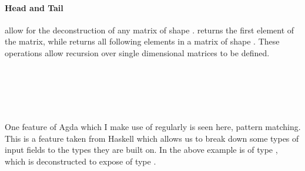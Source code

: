 \paragraph{Head and Tail} allow for the deconstruction of any matrix of shape 
. 
 returns the first element of the matrix, while
 returns all following elements in a matrix of shape .
These operations allow recursion over single dimensional matrices to be defined.

\begin{code}%
%
\>[2]\AgdaSpace{}%
\AgdaSymbol{:}\AgdaSpace{}%
\AgdaSpace{}%
\AgdaSymbol{(}\AgdaSpace{}%
\AgdaSymbol{(}\AgdaSpace{}%
\AgdaSymbol{))}\AgdaSpace{}%
\AgdaSpace{}%
\AgdaSpace{}%
\<%
\\
%
\>[2]\AgdaSpace{}%
\AgdaSpace{}%
\AgdaSymbol{=}\AgdaSpace{}%
\AgdaSpace{}%
\AgdaSymbol{(}\AgdaSpace{}%
\AgdaSymbol{)}\<%
\\
%
\\[\AgdaEmptyExtraSkip]%
%
\>[2]\AgdaSpace{}%
\AgdaSymbol{:}\AgdaSpace{}%
\AgdaSpace{}%
\AgdaSymbol{(}\AgdaSpace{}%
\AgdaSymbol{(}\AgdaSpace{}%
\AgdaSymbol{))}\AgdaSpace{}%
\AgdaSpace{}%
\AgdaSpace{}%
\AgdaSpace{}%
\AgdaSymbol{(}\AgdaSpace{}%
\AgdaSymbol{)}\AgdaSpace{}%
\<%
\\
%
\>[2]\AgdaSpace{}%
\AgdaSpace{}%
\AgdaSymbol{(}\AgdaSpace{}%
\AgdaSymbol{)}\AgdaSpace{}%
\AgdaSymbol{=}\AgdaSpace{}%
\AgdaSpace{}%
\AgdaSymbol{(}\AgdaSpace{}%
\AgdaSymbol{(}\AgdaSpace{}%
\AgdaSymbol{))}\<%
\end{code}

One feature of Agda which I make use of regularly is seen here, pattern
matching.
This is a feature taken from Haskell 
which allows us to break down some types of input fields to the 
types they are built on. 
In the above example  is of type , 
which is deconstructed to expose  of type .

